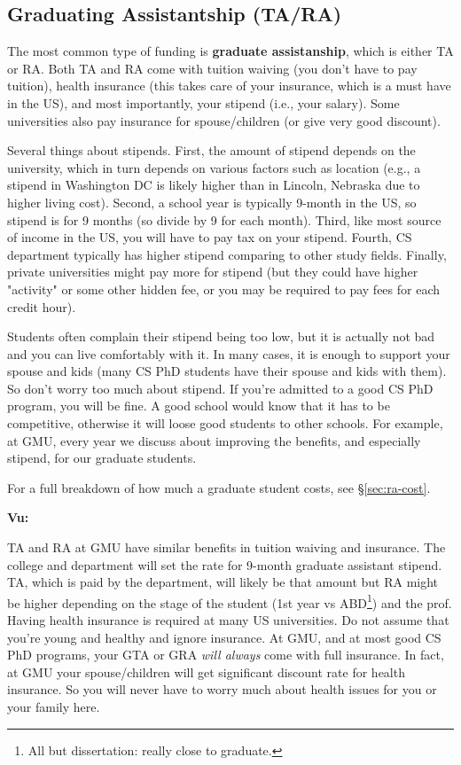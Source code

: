 \documentclass[11pt]{article}
\newenvironment{commentbox}[1][]{
\small
    \begin{mybox}
    {\small \textbf{#1}}
 }{
   \end{mybox}
}
\begin{document}
\subsection{Graduating Assistantship (TA/RA)}
The most common type of funding is \textbf{graduate assistanship}, which is either TA or RA. Both TA and RA come with tuition waiving (you don't have to pay tuition), health insurance (this takes care of your insurance, which is a must have in the US), and most importantly, your stipend (i.e., your salary). Some universities also pay insurance for spouse/children (or give very good discount).

Several things about stipends.  First, the amount of stipend depends on the university, which in turn depends on various factors such as location (e.g., a stipend in Washington DC is likely higher than in Lincoln, Nebraska due to higher living cost). Second, a school year is typically 9-month in the US, so stipend is for 9 months (so divide by 9 for each month). Third, like most source of income in the US, you will have to pay tax on your stipend.  Fourth, CS department typically has higher stipend comparing to other study fields.  Finally, private universities might pay more for stipend (but they could have higher "activity" or some other hidden fee, or you may be required to pay fees for each credit hour).

Students often complain their stipend being too low, but it is actually not bad and you can live comfortably with it.  In many cases, it is enough to support your spouse and kids (many CS PhD students have their spouse and kids with them). So don't worry too much about stipend.  If you're admitted to a good CS PhD program, you will be fine. A good school would know that it has to be competitive, otherwise it will loose good students to other schools.  For example, at GMU, every year we discuss about improving the benefits, and especially stipend, for our graduate students. 

For a full breakdown of how much a graduate student costs, see \S\ref{sec:ra-cost}.

\begin{commentbox}[Vu:]
TA and RA at GMU have similar benefits in tuition waiving and insurance.  The college and department will set the rate for 9-month graduate assistant stipend.  TA, which is paid by the department, will likely be that amount but RA might be higher depending on the stage of the student (1st year vs ABD\footnote{All but dissertation: really close to graduate.}) and the prof. 
\tcblower
Having health insurance is required at many US universities.  Do not assume that you're young and healthy and ignore insurance.  At GMU, and at most good CS PhD programs, your GTA or GRA \emph{will always} come with full insurance. In fact, at GMU your spouse/children will get significant discount rate for health insurance.  So you will never have to worry much about health issues for you or your family here.
\end{commentbox}
\end{document}
